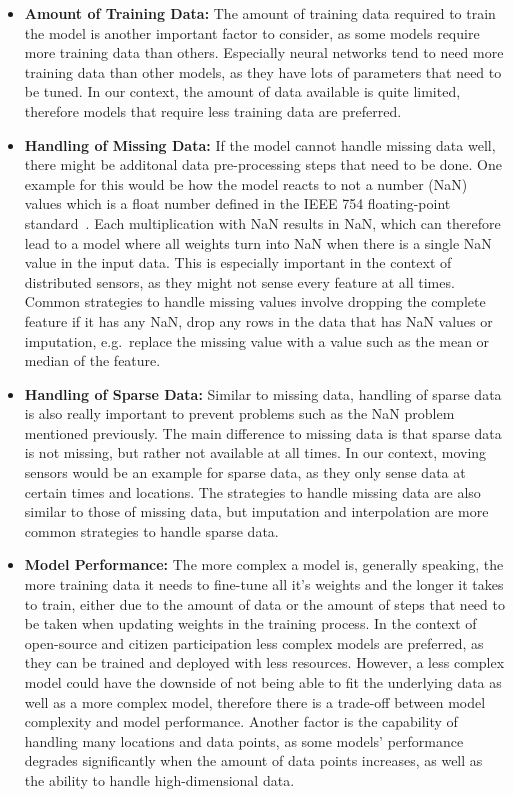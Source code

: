 \begin{itemize}
    \item \textbf{Amount of Training Data:} The amount of training data required to train the model is another important factor to consider, as some models require more training data than others. Especially neural networks tend to need more training data than other models, as they have lots of parameters that need to be tuned. In our context, the amount of data available is quite limited, therefore models that require less training data are preferred.
    \item \textbf{Handling of Missing Data:} If the model cannot handle missing data well, there might be additonal data pre-processing steps that need to be done. One example for this would be how the model reacts to not a number (NaN) values which is a float number defined in the IEEE 754 floating-point standard~\cite{ieee754}. Each multiplication with NaN results in NaN, which can therefore lead to a model where all weights turn into NaN when there is a single NaN value in the input data. This is especially important in the context of distributed sensors, as they might not sense every feature at all times. Common strategies to handle missing values involve dropping the complete feature if it has any NaN, drop any rows in the data that has NaN values or imputation, e.g.\ replace the missing value with a value such as the mean or median of the feature.
    \item \textbf{Handling of Sparse Data:} Similar to missing data, handling of sparse data is also really important to prevent problems such as the NaN problem mentioned previously. The main difference to missing data is that sparse data is not missing, but rather not available at all times. In our context, moving sensors would be an example for sparse data, as they only sense data at certain times and locations. The strategies to handle missing data are also similar to those of missing data, but imputation and interpolation are more common strategies to handle sparse data.
    \item \textbf{Model Performance:} The more complex a model is, generally speaking, the more training data it needs to fine-tune all it's weights and the longer it takes to train, either due to the amount of data or the amount of steps that need to be taken when updating weights in the training process. In the context of open-source and citizen participation less complex models are preferred, as they can be trained and deployed with less resources. However, a less complex model could have the downside of not being able to fit the underlying data as well as a more complex model, therefore there is a trade-off between model complexity and model performance. Another factor is the capability of handling many locations and data points, as some models' performance degrades significantly when the amount of data points increases, as well as the ability to handle high-dimensional data.

\end{itemize}
